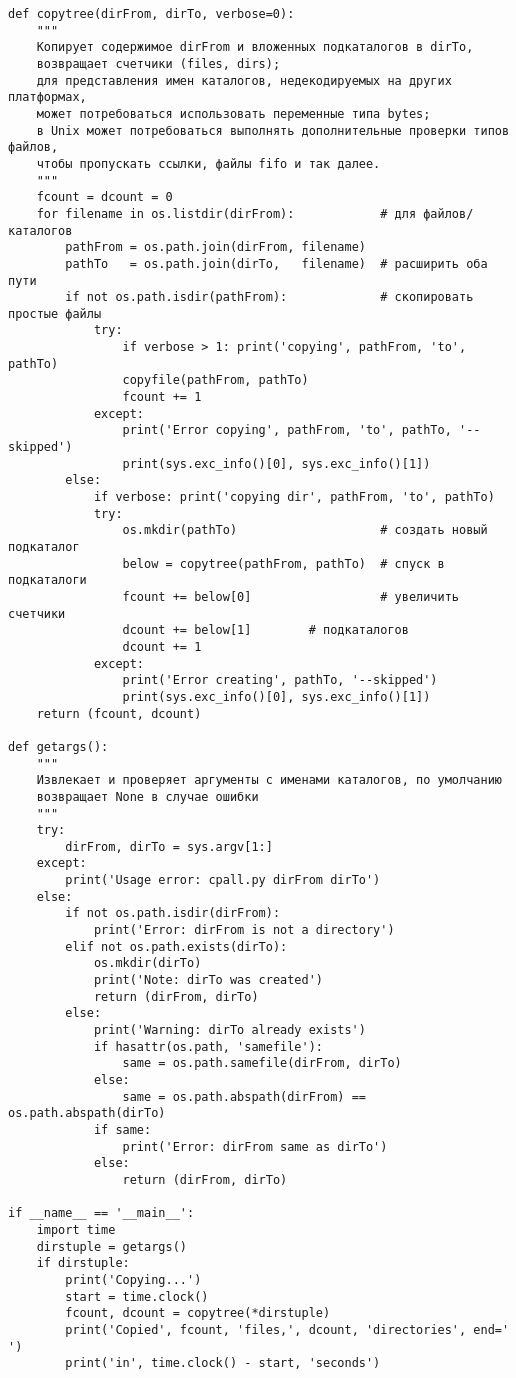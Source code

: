 \documentclass[12pt]{article}
\begin{document}
\begin{verbatim}
def copytree(dirFrom, dirTo, verbose=0):
    """
    Копирует содержимое dirFrom и вложенных подкаталогов в dirTo,
	возвращает счетчики (files, dirs);
	для представления имен каталогов, недекодируемых на других платформах,
	может потребоваться использовать переменные типа bytes;
	в Unix может потребоваться выполнять дополнительные проверки типов файлов,
	чтобы пропускать ссылки, файлы fifo и так далее.
    """
    fcount = dcount = 0
    for filename in os.listdir(dirFrom):            # для файлов/каталогов
        pathFrom = os.path.join(dirFrom, filename)
        pathTo   = os.path.join(dirTo,   filename)  # расширить оба пути
        if not os.path.isdir(pathFrom):             # скопировать простые файлы
            try:
                if verbose > 1: print('copying', pathFrom, 'to', pathTo)
                copyfile(pathFrom, pathTo)
                fcount += 1
            except:
                print('Error copying', pathFrom, 'to', pathTo, '--skipped')
                print(sys.exc_info()[0], sys.exc_info()[1])
        else:
            if verbose: print('copying dir', pathFrom, 'to', pathTo)
            try:
                os.mkdir(pathTo)                    # создать новый подкаталог
                below = copytree(pathFrom, pathTo)  # спуск в подкаталоги
                fcount += below[0]                  # увеличить счетчики
                dcount += below[1]		  # подкаталогов
                dcount += 1
            except:
                print('Error creating', pathTo, '--skipped')
                print(sys.exc_info()[0], sys.exc_info()[1])
    return (fcount, dcount)

def getargs():
    """
    Извлекает и проверяет аргументы с именами каталогов, по умолчанию
	возвращает None в случае ошибки
    """
    try:
        dirFrom, dirTo = sys.argv[1:]
    except:
        print('Usage error: cpall.py dirFrom dirTo')
    else:
        if not os.path.isdir(dirFrom):
            print('Error: dirFrom is not a directory')
        elif not os.path.exists(dirTo):
            os.mkdir(dirTo)
            print('Note: dirTo was created')
            return (dirFrom, dirTo)
        else:
            print('Warning: dirTo already exists')
            if hasattr(os.path, 'samefile'):
                same = os.path.samefile(dirFrom, dirTo)
            else:
                same = os.path.abspath(dirFrom) == os.path.abspath(dirTo)
            if same:
                print('Error: dirFrom same as dirTo')
            else:
                return (dirFrom, dirTo)

if __name__ == '__main__':
    import time
    dirstuple = getargs()
    if dirstuple:
        print('Copying...')
        start = time.clock()
        fcount, dcount = copytree(*dirstuple)
        print('Copied', fcount, 'files,', dcount, 'directories', end=' ')
        print('in', time.clock() - start, 'seconds')
\end{verbatim}
\end{document}
